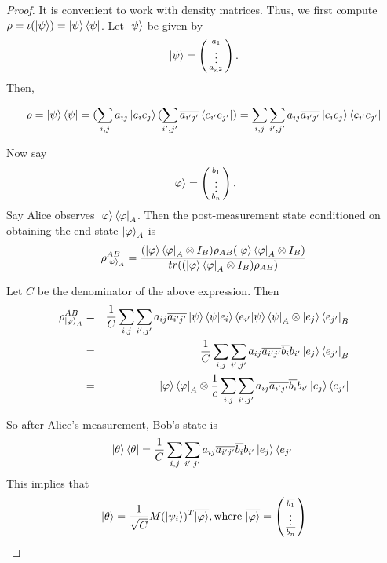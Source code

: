 \begin{proof}
It is convenient to work with density matrices.  Thus, we first compute $\rho=\iota(\ket{\psi})=\ket{\psi}\bra{\psi}$.  Let $\ket{\psi}$ be given by 
\begin{equation}
\ket{\psi}=\left(\begin{smallmatrix}a_1\\ \vdots \\a_{n^2}\end{smallmatrix}\right).
\end{equation}
Then, 

\begin{equation}
\rho=\ket{\psi}\bra{\psi}=(\sum_{i,j} a_{ij}\ket{e_i e_j}(\sum_{i',j'} \overline{a_{i'j'}}\bra{e_{i'} e_{j'}})=\sum_{i,j} \sum_{i',j'} a_{ij} \overline{a_{i'j'}}\ket{e_i e_j}\bra{e_{i'} e_{j'}}   
\end{equation}

Now say
\begin{equation}
\ket{\varphi}=\left(\begin{smallmatrix}b_1\\ \vdots \\b_n\end{smallmatrix}\right).
\end{equation}
Say Alice observes $\ket{\varphi}\bra{\varphi}_A$.
Then the post-measurement state conditioned on obtaining the end state $\ket{\varphi}_A$ is
\begin{equation}
\rho_{\ket{\varphi}_A}^{AB}=\frac{(\ket{\varphi}\bra{\varphi}_A \otimes I_B)\rho_{AB}(\ket{\varphi}\bra{\varphi}_A \otimes I_B)}{tr((\ket{\varphi}\bra{\varphi}_A \otimes I_B)\rho_{AB})}
\end{equation}

Let $C$ be the denominator of the above expression. Then 
\begin{eqnarray}
\rho_{\ket{\varphi}_A}^{AB}&=&\frac{1}{C} \sum_{i,j} \sum_{{i'}, {j'}} a_{ij} \overline{a_{i'j'}}\ket{\psi}\braket{\psi|e_i}\braket{e_{i'}|\psi}\bra{\psi}_A \otimes \ket{e_j}\bra{e_{j'}}_B\\
&=&\frac{1}{C} \sum_{i,j} \sum_{{i'}, {j'}} a_{ij} \overline{a_{i'j'}}\overline{b_i}b_{i'}\ket{e_j}\bra{e_{j'}}_B\\
&=&\ket{\varphi}\bra{\varphi}_A \otimes \frac{1}{c} \sum_{i,j} \sum_{{i'}, {j'}} a_{ij} \overline{a_{i'j'}}\overline{b_i}b_{i'}\ket{e_j}\bra{e_{j'}}
\end{eqnarray}

So after Alice's measurement, Bob's state is
\begin{equation}
    \ket{\theta}\bra{\theta}=\frac{1}{C} \sum_{i,j} \sum_{{i'}, {j'}} a_{ij} \overline{a_{i'j'}}\overline{b_i}b_{i'}\ket{e_j}\bra{e_{j'}} 
\end{equation}
This implies that 
\begin{equation}
    \ket{\theta}=\frac{1}{\sqrt{C}} M(\ket{\psi_i})^T \overline{\ket{\varphi}},
    \text{where } \overline{\ket{\varphi}}=\left(\begin{smallmatrix}\overline{b_1}\\ \vdots \\ \overline{b_n}\end{smallmatrix}\right)
\end{equation}



\end{proof}
